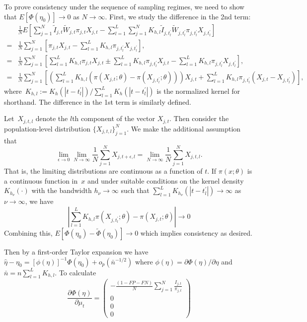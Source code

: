 \documentclass[11pt]{amsart}
\numberwithin{equation}{section}
\theoremstyle{plain}
\begin{document}
To prove consistency under the sequence of sampling regimes, we need to show that $E[ \Phi (\eta_0) ] \to 0$ as $N \to \infty$.  First, we study the difference in the 2nd term:
\begin{align*}
&\frac{1}{N}  E \left[ \sum_{j = 1}^N \tilde I_{j,t} \tilde W_{j,t}  \pi_{j,t} X_{j,t} - \sum_{l=1}^L  \sum_{j = 1}^N K_{h,l} \tilde I_{j,t^\prime_l} \tilde W_{j,t^\prime_l}  \pi_{j,t^\prime_l} X_{j,t^\prime_l} \right] \\
= &\frac{1}{N} \sum_{j = 1}^N \left[ \pi_{j,t} X_{j,t} - \sum_{l=1}^L K_{h,l} \pi_{j,t^\prime_l} X_{j,t^\prime_l} \right], \\
= &\frac{1}{N} \sum_{j = 1}^N \left[ \sum_{l=1}^L K_{h,l} \pi_{j,t} X_{j,t} \pm \sum_{l=1}^L K_{h,l} \pi_{j,t_l^\prime} X_{j,t}  - \sum_{l=1}^L K_{h, l} \pi_{j,t^\prime_l} X_{j,t^\prime_l} \right], \\
= &\frac{1}{N} \sum_{j = 1}^N \left[ \left( \sum_{l=1}^L K_{h,l}  \left( \pi (X_{j,t}; \theta) - \pi (X_{j,t^\prime_l}; \theta) \right) \right) X_{j,t} + \sum_{l=1}^L K_{h,l} \pi_{j,t^\prime_l} (X_{j,t} - X_{j,t^\prime_l} ) \right],
\end{align*}
where~$K_{h,l} := K_h(|t - t_l^\prime|) / \sum_{l=1}^L K_{h} \left(|t - t_l^\prime| \right)$ is the normalized kernel for shorthand. The difference in the 1st term is similarly defined.

Let~$X_{j,t,l}$ denote the $l$th component of the vector $X_{j,t}$.  Then consider the population-level distribution $\{ X_{j,t,l} \}_{j=1}^N$.  We make the additional assumption that
$$
\lim_{\epsilon \to 0} \lim_{N \to \infty} \frac{1}{N} \sum_{j=1}^N X_{j,t+\epsilon, l}  = \lim_{N \to \infty} \frac{1}{N} \sum_{j=1}^N X_{j,t, l}.
$$
That is, the limiting distributions are continuous as a function of $t$. If $\pi(x; \theta)$ is a continuous function in~$x$ and under suitable conditions on the kernel density~$K_{h_\nu} (\cdot)$ with the bandwidth $h_\nu \to \infty$ such that $\sum_{l=1}^L K_{h_{\nu}} \left( | t - t_l^\prime | \right) \to \infty$ as $\nu \to \infty$, we have
$$
\left | \sum_{l=1}^L K_{h, l} \pi (X_{j, t_l^\prime}; \theta) - \pi (X_{j, t}; \theta) \right|  \to 0
$$
Combining this, $E \left[ \Phi(\eta_0)  - \tilde \Phi (\eta_0) \right] \to 0$ which implies consistency as desired.

Then by a first-order Taylor expansion we have $\hat \eta - \eta_0 = \left[ \phi (\eta) \right]^{-1} \Phi(\eta_0) + o_p (\bar n^{-1/2})$ where $\phi(\eta) = \partial \Phi (\eta)/\partial \eta$ and $\bar n = n \sum_{l=1}^L K_{h,l}$.  To calculate
$$
\frac{\partial \Phi (\eta)}{\partial \mu_t} =
\left (
\begin{array}{c}
-\frac{(1-FP-FN)}{N} \sum_{j=1}^N \frac{I_{j,t}}{\pi_{j,t}} \\
0 \\
0 \\
0
\end{array}
\right )
$$
\end{document}
